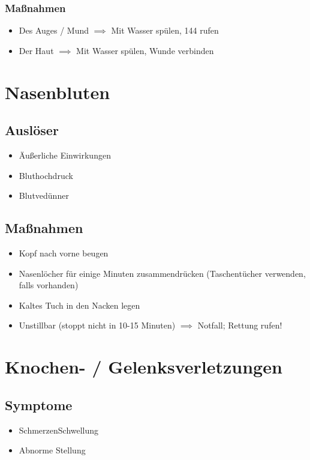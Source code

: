 \subsection*{Maßnahmen}
\begin{itemize}
    \item Des Auges / Mund $\implies$ Mit Wasser spülen, 144 rufen
    \item Der Haut $\implies$ Mit Wasser spülen, Wunde verbinden
\end{itemize}

\chapter{Nasenbluten}

\section*{Auslöser}
\begin{itemize}
    \item Äußerliche Einwirkungen
    \item Bluthochdruck
    \item Blutvedünner
\end{itemize}

\section*{Maßnahmen}
\begin{itemize}
    \item Kopf nach vorne beugen
    \item Nasenlöcher für einige Minuten zusammendrücken (Taschentücher verwenden, falls vorhanden)
    \item Kaltes Tuch in den Nacken legen
    \item Unstillbar (stoppt nicht in 10-15 Minuten) $\implies$ Notfall; Rettung rufen!
\end{itemize}

\chapter{Knochen- / Gelenksverletzungen}
\section*{Symptome}
\begin{itemize}
    \item SchmerzenSchwellung
    \item Abnorme Stellung
\end{itemize}
